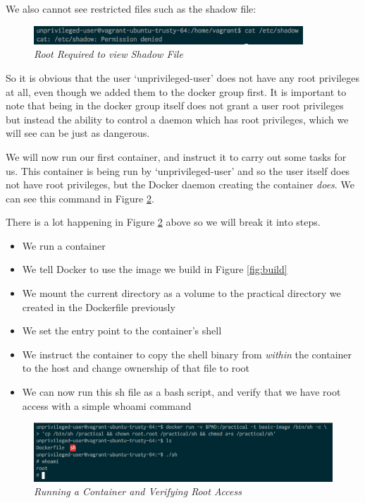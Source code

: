 \documentclass{article}
\begin{document}
We also cannot see restricted files such as the shadow file:
\begin{figure}[!h]
\centering
\includegraphics*[width=0.9\textwidth]{components/images/non-root-shadow}
\caption{\em Root Required to view Shadow File}
\label{fig:non-root-shadow}
\end{figure}

So it is obvious that the user `unprivileged-user' does not have any root privileges at all, even though we added them to the docker group first. It is important to note that being in the docker group itself does not grant a user root privileges but instead the ability to control a daemon which has root privileges, which we will see can be just as dangerous. 

We will now run our first container, and instruct it to carry out some tasks for us. This container is being run by `unprivileged-user' and so the user itself does not have root privileges, but the Docker daemon creating the container \textit{does}. We can see this command in Figure \ref{fig:run-container-whoami}.

There is a lot happening in Figure \ref{fig:run-container-whoami} above so we will break it into steps. 

\begin{itemize}
  \item We run a container
  \item We tell Docker to use the image we build in Figure \ref{fig:build}
  \item We mount the current directory as a volume to the practical directory we created in the Dockerfile previously
  \item We set the entry point to the container's shell
  \item We instruct the container to copy the shell binary from \textit{within} the container to the host and change ownership of that file to root
  \item We can now run this sh file as a bash script, and verify that we have root access with a simple whoami command
\end{itemize}

\begin{figure}[!h]
\centering
\includegraphics*[width=\textwidth]{components/images/run-container-whoami}
\caption{\em Running a Container and Verifying Root Access}
\label{fig:run-container-whoami}
\end{figure}
\end{document}
